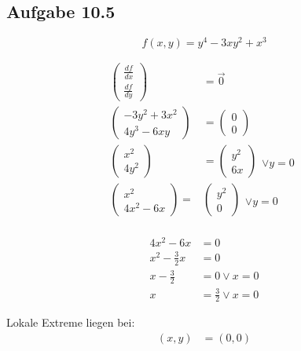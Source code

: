 \documentclass{standalone}
\begin{document}
\subsection{Aufgabe 10.5}

$$ f(x,y) = y^4 - 3xy^2 + x^3 $$

\begin{align}
    \begin{pmatrix}
        \frac{df}{dx} \\
        \frac{df}{dy}
    \end{pmatrix}
    &= \vec{0}\\
    \begin{pmatrix}
        -3y^2 + 3x^2 \\
        4y^3 - 6xy
    \end{pmatrix}
    &= \begin{pmatrix}
        0 \\
        0
    \end{pmatrix} \\
    \begin{pmatrix}
        x^2 \\
        4y^2
    \end{pmatrix}
    &= \begin{pmatrix}
        y^2 \\
        6x
    \end{pmatrix}
    \begin{matrix}
        \\
        \vee y = 0
    \end{matrix} \\
    \begin{pmatrix}
        x^2 \\
        4x^2 - 6x 
    \end{pmatrix}
    =& \begin{pmatrix}
        y^2 \\
        0
    \end{pmatrix}
    \begin{matrix}
        \\
        \vee y = 0
    \end{matrix} \\
\end{align}

\begin{align}
    4x^2 - 6 x &= 0 \\
    x^2 - \frac{3}{2} x &= 0 \\
    x - \frac{3}{2} &= 0 \vee x = 0 \\
    x &= \frac{3}{2} \vee x = 0
\end{align}

Lokale Extreme liegen bei:
\begin{align}
    (x,y) &= (0,0)
\end{align}
\end{document}
